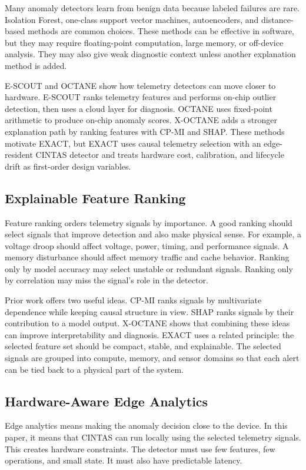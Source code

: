 Many anomaly detectors learn from benign data because labeled failures are rare. Isolation Forest, one-class support vector machines, autoencoders, and distance-based methods are common choices. These methods can be effective in software, but they may require floating-point computation, large memory, or off-device analysis. They may also give weak diagnostic context unless another explanation method is added.

E-SCOUT and OCTANE show how telemetry detectors can move closer to hardware. E-SCOUT ranks telemetry features and performs on-chip outlier detection, then uses a cloud layer for diagnosis. OCTANE uses fixed-point arithmetic to produce on-chip anomaly scores. X-OCTANE adds a stronger explanation path by ranking features with CP-MI and SHAP. These methods motivate EXACT, but EXACT uses causal telemetry selection with an edge-resident CINTAS detector and treats hardware cost, calibration, and lifecycle drift as first-order design variables.

\subsection{Explainable Feature Ranking}

Feature ranking orders telemetry signals by importance. A good ranking should select signals that improve detection and also make physical sense. For example, a voltage droop should affect voltage, power, timing, and performance signals. A memory disturbance should affect memory traffic and cache behavior. Ranking only by model accuracy may select unstable or redundant signals. Ranking only by correlation may miss the signal's role in the detector.

Prior work offers two useful ideas. CP-MI ranks signals by multivariate dependence while keeping causal structure in view. SHAP ranks signals by their contribution to a model output. X-OCTANE shows that combining these ideas can improve interpretability and diagnosis. EXACT uses a related principle: the selected feature set should be compact, stable, and explainable. The selected signals are grouped into compute, memory, and sensor domains so that each alert can be tied back to a physical part of the system.

\subsection{Hardware-Aware Edge Analytics}

Edge analytics means making the anomaly decision close to the device. In this paper, it means that CINTAS can run locally using the selected telemetry signals. This creates hardware constraints. The detector must use few features, few operations, and small state. It must also have predictable latency.

